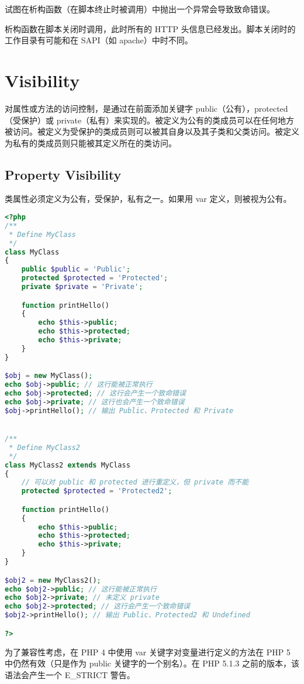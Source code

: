 试图在析构函数（在脚本终止时被调用）中抛出一个异常会导致致命错误。

析构函数在脚本关闭时调用，此时所有的 HTTP 头信息已经发出。脚本关闭时的工作目录有可能和在 SAPI（如 apache）中时不同。


\chapter{Visibility}

对属性或方法的访问控制，是通过在前面添加关键字 public（公有），protected（受保护）或 private（私有）来实现的。被定义为公有的类成员可以在任何地方被访问。被定义为受保护的类成员则可以被其自身以及其子类和父类访问。被定义为私有的类成员则只能被其定义所在的类访问。

\section{Property Visibility}


类属性必须定义为公有，受保护，私有之一。如果用 var 定义，则被视为公有。

\begin{lstlisting}[language=PHP]
<?php
/**
 * Define MyClass
 */
class MyClass
{
    public $public = 'Public';
    protected $protected = 'Protected';
    private $private = 'Private';

    function printHello()
    {
        echo $this->public;
        echo $this->protected;
        echo $this->private;
    }
}

$obj = new MyClass();
echo $obj->public; // 这行能被正常执行
echo $obj->protected; // 这行会产生一个致命错误
echo $obj->private; // 这行也会产生一个致命错误
$obj->printHello(); // 输出 Public、Protected 和 Private


/**
 * Define MyClass2
 */
class MyClass2 extends MyClass
{
    // 可以对 public 和 protected 进行重定义，但 private 而不能
    protected $protected = 'Protected2';

    function printHello()
    {
        echo $this->public;
        echo $this->protected;
        echo $this->private;
    }
}

$obj2 = new MyClass2();
echo $obj2->public; // 这行能被正常执行
echo $obj2->private; // 未定义 private
echo $obj2->protected; // 这行会产生一个致命错误
$obj2->printHello(); // 输出 Public、Protected2 和 Undefined

?>
\end{lstlisting}


为了兼容性考虑，在 PHP 4 中使用 var 关键字对变量进行定义的方法在 PHP 5 中仍然有效（只是作为 public 关键字的一个别名）。在 PHP 5.1.3 之前的版本，该语法会产生一个 E\_STRICT 警告。


